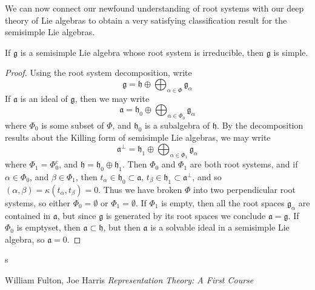 We can now connect our newfound understanding of root systems with our deep theory of Lie algebras to obtain a very satisfying classification result for the semisimple Lie algebras.

\begin{theorem}
    If $\mathfrak{g}$ is a semisimple Lie algebra whose root system is irreducible, then $\mathfrak{g}$ is simple.
\end{theorem}
\begin{proof}
    Using the root system decomposition, write
    \[ \mathfrak{g} = \mathfrak{h} \oplus \bigoplus_{\alpha \in \Phi} \mathfrak{g}_\alpha \]
    If $\mathfrak{a}$ is an ideal of $\mathfrak{g}$, then we may write
    \[ \mathfrak{a} = \mathfrak{h}_0 \oplus \bigoplus_{\alpha \in \Phi_0} \mathfrak{g}_\alpha \]
    where $\Phi_0$ is some subset of $\Phi$, and $\mathfrak{h}_0$ is a subalgebra of $\mathfrak{h}$. By the decomposition results about the Killing form of semisimple Lie algebras, we may write
    \[ \mathfrak{a}^\perp = \mathfrak{h}_1 \oplus \bigoplus_{\alpha \in \Phi_1} \mathfrak{g}_\alpha \]
    where $\Phi_1 = \Phi_0^c$, and $\mathfrak{h} = \mathfrak{h}_0 \oplus \mathfrak{h}_1$. Then $\Phi_0$ and $\Phi_1$ are both root systems, and if $\alpha \in \Phi_0$, and $\beta \in \Phi_1$, then $t_\alpha \in \mathfrak{h}_0 \subset \mathfrak{a}$, $t_\beta \in \mathfrak{h}_1 \subset \mathfrak{a}^\perp$, and so $(\alpha, \beta) = \kappa(t_\alpha, t_\beta) = 0$. Thus we have broken $\Phi$ into two perpendicular root systems, so either $\Phi_0 = \emptyset$ or $\Phi_1 = \emptyset$. If $\Phi_1$ is empty, then all the root spaces $\mathfrak{g}_\alpha$ are contained in $\mathfrak{a}$, but since $\mathfrak{g}$ is generated by its root spaces we conclude $\mathfrak{a} = \mathfrak{g}$. If $\Phi_0$ is emptyset, then $\mathfrak{a} \subset \mathfrak{h}$, but then $\mathfrak{a}$ is a solvable ideal in a semisimple Lie algebra, so $\mathfrak{a} = 0$.
\end{proof}

\begin{example}
    s
\end{example}






\begin{thebibliography}{9}

William Fulton, Joe Harris
\textit{Representation Theory: A First Course}

\end{thebibliography}


















